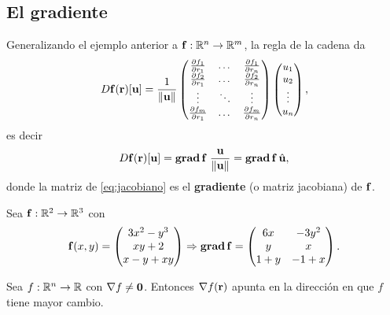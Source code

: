 \subsection{El gradiente}
\label{subsec:gradiente}

Generalizando el ejemplo anterior a $\mathbf{f}:\mathbb{R}^n\rightarrow\mathbb{R}^m$, la regla de
la cadena da
\begin{equation}
  \label{eq:jacobiano}
  \small
  D\mathbf{f}(\mathbf{r})[\mathbf{u}]=\frac{1}{\lVert \mathbf{u} \rVert}
  \begin{pmatrix}
    \frac{\partial f_1}{\partial r_1} & \dots & \frac{\partial f_1}{\partial r_n}\\
    \frac{\partial f_2}{\partial r_1} & \dots & \frac{\partial f_2}{\partial r_n}\\
    \vdots & \ddots & \vdots\\
    \frac{\partial f_m}{\partial r_1} & \dots & \frac{\partial f_m}{\partial r_n}
  \end{pmatrix}
  \begin{pmatrix}
    u_1\\u_2\\\vdots\\u_n
  \end{pmatrix},
\end{equation}
es decir
\begin{equation}
  \label{eq:gradiente_matriz}
  D\mathbf{f}(\mathbf{r})[\mathbf{u}]=\operatorname{\mathbf{grad}}\mathbf{f}\;\frac{\mathbf{u}}{\lVert \mathbf{u} \rVert}
    =\operatorname{\mathbf{grad}}\mathbf{f}\,\hat{\mathbf{u}},
\end{equation}
donde la matriz de \eqref{eq:jacobiano} es el \textbf{gradiente} (o matriz
jacobiana) de $\mathbf{f}$.

\begin{ejemplo}
  \label{ej:gradiente_matriz}
  Sea $\mathbf{f}:\mathbb{R}^2\rightarrow\mathbb{R}^3$ con
  \begin{equation}
    \label{eq:f_ejemplo_gradiente}
    \mathbf{f}(x,y)=
    \begin{pmatrix}
      3x^2-y^3\\
      xy+2\\
      x-y+xy
    \end{pmatrix}
    \Rightarrow
    \operatorname{\mathbf{grad}}\mathbf{f}=
    \begin{pmatrix}
      6x & -3y^2\\
      y & x\\
      1+y & -1+x
    \end{pmatrix}.
  \end{equation}
\end{ejemplo}

\begin{teorema}
  \label{teo:maximo_cambio}
  Sea $f:\mathbb{R}^n\rightarrow\mathbb{R}$ con $\nabla f\neq\mathbf{0}$. Entonces
  $\nabla f(\mathbf{r})$ apunta en la direcci\'on en que $f$ tiene mayor cambio.
\end{teorema}

